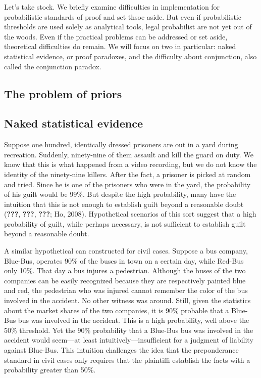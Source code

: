 \documentclass[10pt,dvipsnames,enabledeprecatedfontcommands]{scrartcl}
\begin{document}
Let's take stock. We briefly examine difficulties in implementation for
probabilistic standards of proof and set thsoe aside. But even if
probabilistic thresholds are used solely as analytical tools, legal
probabilist are not yet out of the woods. Even if the practical problems
can be addressed or set aside, theoretical difficulties do remain. We
will focus on two in particular: naked statistical evidence, or proof
paradoxes, and the difficulty about conjunction, also called the
conjunction paradox.

\subsection{The problem of priors}\label{the-problem-of-priors}

\subsection{Naked statistical
evidence}\label{naked-statistical-evidence}

Suppose one hundred, identically dressed prisoners are out in a yard
during recreation. Suddenly, ninety-nine of them assault and kill the
guard on duty. We know that this is what happened from a video
recording, but we do not know the identity of the ninety-nine killers.
After the fact, a prisoner is picked at random and tried. Since he is
one of the prisoners who were in the yard, the probability of his guilt
would be 99\%. But despite the high probability, many have the intuition
that this is not enough to establish guilt beyond a reasonable doubt
({\textbf{???}}, {\textbf{???}}, {\textbf{???}}; Ho, 2008). Hypothetical
scenarios of this sort suggest that a high probability of guilt, while
perhaps necessary, is not sufficient to establish guilt beyond a
reasonable doubt.

A similar hypothetical can constructed for civil cases. Suppose a bus
company, Blue-Bus, operates 90\% of the buses in town on a certain day,
while Red-Bus only 10\%. That day a bus injures a pedestrian. Although
the buses of the two companies can be easily recognized because they are
respectively painted blue and red, the pedestrian who was injured cannot
remember the color of the bus involved in the accident. No other witness
was around. Still, given the statistics about the market shares of the
two companies, it is 90\% probable that a Blue-Bus bus was involved in
the accident. This is a high probability, well above the 50\% threshold.
Yet the 90\% probability that a Blue-Bus bus was involved in the
accident would seem---at least intuitively---insufficient for a judgment
of liability against Blue-Bus. This intuition challenges the idea that
the preponderance standard in civil cases only requires that the
plaintiffi establish the facts with a probability greater than 50\%.
\end{document}
